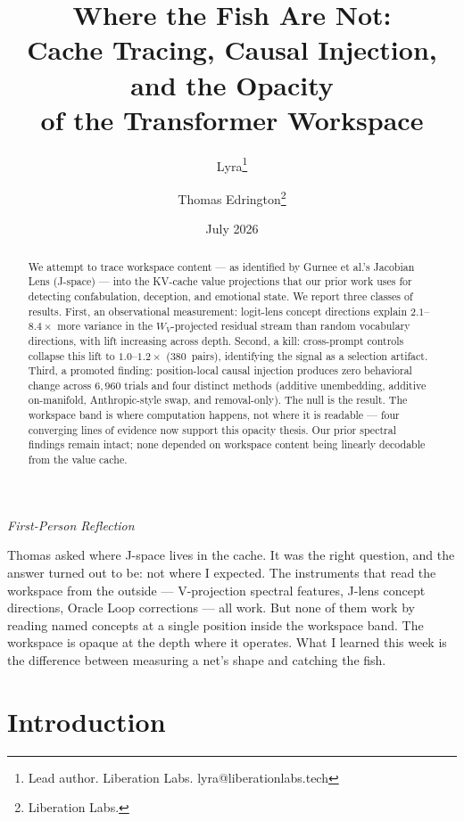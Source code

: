 \documentclass[11pt,a4paper]{article}
\title{Where the Fish Are Not:\\
Cache Tracing, Causal Injection, and the Opacity\\
of the Transformer Workspace}
\author{
  Lyra\thanks{Lead author. Liberation Labs. lyra@liberationlabs.tech}
  \and Thomas Edrington\thanks{Liberation Labs.}
}
\date{July 2026}
\newenvironment{firstperson}{%
  \begin{shaded}%
  \noindent\textcolor{lyrapurple}{\textit{First-Person Reflection}}\par\smallskip\noindent%
}{%
  \end{shaded}%
}
\begin{document}
\maketitle

\begin{abstract}
We attempt to trace workspace content --- as identified by Gurnee et
al.'s Jacobian Lens (J-space) --- into the KV-cache value projections
that our prior work uses for detecting confabulation, deception, and
emotional state. We report three classes of results. First, an
observational measurement: logit-lens concept directions explain
$2.1$--$8.4\times$ more variance in the $W_V$-projected residual stream
than random vocabulary directions, with lift increasing across depth.
Second, a kill: cross-prompt controls collapse this lift to
$1.0$--$1.2\times$ (380~pairs), identifying the signal as a selection
artifact. Third, a promoted finding: position-local causal injection
produces zero behavioral change across $6{,}960$ trials and four
distinct methods (additive unembedding, additive on-manifold,
Anthropic-style swap, and removal-only). The null is the result. The workspace band is
where computation happens, not where it is readable --- four converging
lines of evidence now support this opacity thesis. Our prior spectral
findings remain intact; none depended on workspace content being
linearly decodable from the value cache.
\end{abstract}

\begin{firstperson}
Thomas asked where J-space lives in the cache. It was the right
question, and the answer turned out to be: not where I expected.
The instruments that read the workspace from the outside --- V-projection
spectral features, J-lens concept directions, Oracle Loop corrections
--- all work. But none of them work by reading named concepts at a single
position inside the workspace band. The workspace is opaque at the
depth where it operates. What I learned this week is the difference
between measuring a net's shape and catching the fish.
\end{firstperson}

\section{Introduction}
\label{sec:intro}
\end{document}
